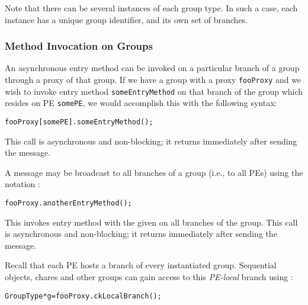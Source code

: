 
Note that there can be several instances of each group type.
In such a case, each instance has a unique group identifier, and its own set
of branches.

\subsubsection{Method Invocation on Groups}

An asynchronous entry method can be invoked on a particular branch of a
group through a proxy of that group. If we have a group with a proxy
{\tt fooProxy} and we wish to invoke entry method {\tt someEntryMethod} on
that branch of the group which resides on PE {\tt somePE}, we would accomplish
this with the following syntax:

\begin{alltt}
 fooProxy[somePE].someEntryMethod();
\end{alltt}

This call is asynchronous and non-blocking; it returns immediately after sending the message.

A message may be broadcast  to all branches of a group
(i.e., to all PEs) using the notation :

\begin{alltt}
 fooProxy.anotherEntryMethod();
\end{alltt}

This invokes entry method  with the given  on 
all branches of the group. This call is asynchronous and non-blocking; it returns immediately
after sending the message.

Recall that each PE hosts a branch of every instantiated group. 
Sequential objects, chares and other groups can gain access to this {\em PE-local}
branch using :

\begin{alltt}
GroupType *g=fooProxy.ckLocalBranch();
\end{alltt}


